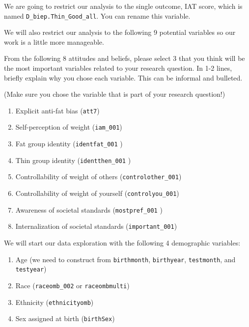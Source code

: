 \documentclass[
  letterpaper,
  DIV=11,
  numbers=noendperiod]{scrartcl}
\providecommand{\tightlist}{%
  \setlength{\itemsep}{0pt}\setlength{\parskip}{0pt}}\usepackage{longtable,booktabs,array}
\begin{document}
We are going to restrict our analysis to the single outcome, IAT score,
which is named \texttt{D\_biep.Thin\_Good\_all}. You can rename this
variable.

We will also restrict our analysis to the following 9 potential
variables so our work is a little more manageable.

\begin{tcolorbox}[enhanced jigsaw, coltitle=black, bottomrule=.15mm, opacityback=0, arc=.35mm, toprule=.15mm, colbacktitle=quarto-callout-important-color!10!white, left=2mm, colback=white, opacitybacktitle=0.6, colframe=quarto-callout-important-color-frame, rightrule=.15mm, leftrule=.75mm, breakable, bottomtitle=1mm, titlerule=0mm, toptitle=1mm, title=\textcolor{quarto-callout-important-color}{\faExclamation}\hspace{0.5em}{Task}]

From the following 8 attitudes and beliefs, please select 3 that you
think will be the most important variables related to your research
question. In 1-2 lines, briefly explain why you chose each variable.
This can be informal and bulleted.

\end{tcolorbox}

(Make sure you chose the variable that is part of your research
question!)

\begin{enumerate}
\def\labelenumi{\arabic{enumi}.}
\tightlist
\item
  Explicit anti-fat bias (\texttt{att7})
\item
  Self-perception of weight (\texttt{iam\_001})
\item
  Fat group identity (\texttt{identfat\_001} )
\item
  Thin group identity (\texttt{identthen\_001} )
\item
  Controllability of weight of others (\texttt{controlother\_001})
\item
  Controllability of weight of yourself (\texttt{controlyou\_001})
\item
  Awareness of societal standards (\texttt{mostpref\_001} )
\item
  Internalization of societal standards (\texttt{important\_001})
\end{enumerate}

We will start our data exploration with the following 4 demographic
variables:

\begin{enumerate}
\def\labelenumi{\arabic{enumi}.}
\tightlist
\item
  Age (we need to construct from \texttt{birthmonth},
  \texttt{birthyear}, \texttt{testmonth}, and \texttt{testyear})
\item
  Race (\texttt{raceomb\_002} or \texttt{raceombmulti})
\item
  Ethnicity (\texttt{ethnicityomb})
\item
  Sex assigned at birth (\texttt{birthSex})
\end{enumerate}
\end{document}
